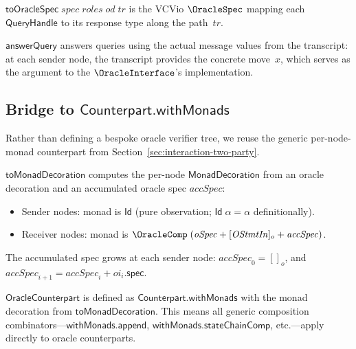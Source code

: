 \begin{definition}[toOracleSpec]
  \label{int:to-oracle-spec}
  $\mathsf{toOracleSpec}\;\mathit{spec}\;\mathit{roles}\;\mathit{od}\;
  \mathit{tr}$ is the VCVio $\OracleSpec$ mapping each $\mathsf{QueryHandle}$
  to its response type along the path~$\mathit{tr}$.
\end{definition}

$\mathsf{answerQuery}$ answers queries using the actual message values from the
transcript: at each sender node, the transcript provides the concrete move~$x$,
which serves as the argument to the $\OracleInterface$'s implementation.

\subsection{Bridge to \texorpdfstring{$\mathsf{Counterpart.withMonads}$}{Counterpart.withMonads}}

Rather than defining a bespoke oracle verifier tree, we reuse the generic
per-node-monad counterpart from Section~\ref{sec:interaction-two-party}.

\begin{definition}[toMonadDecoration]
  \label{int:to-monad-decoration}
  $\mathsf{toMonadDecoration}$ computes the per-node $\mathsf{MonadDecoration}$
  from an oracle decoration and an accumulated oracle spec $\mathit{accSpec}$:
  \begin{itemize}
    \item Sender nodes: monad is $\mathsf{Id}$ (pure observation; $\mathsf{Id}\;\alpha = \alpha$ definitionally).
    \item Receiver nodes: monad is $\OracleComp\;(\mathit{oSpec} + [\mathit{OStmtIn}]_o + \mathit{accSpec})$.
  \end{itemize}
  The accumulated spec grows at each sender node:
  $\mathit{accSpec}_0 = []_o$, and
  $\mathit{accSpec}_{i+1} = \mathit{accSpec}_i + \mathit{oi}_i.\mathsf{spec}$.
\end{definition}

\begin{definition}[OracleCounterpart]
  \label{int:oracle-counterpart}
  $\mathsf{OracleCounterpart}$ is defined as
  $\mathsf{Counterpart.withMonads}$ with the monad decoration from
  $\mathsf{toMonadDecoration}$.  This means all generic composition
  combinators---$\mathsf{withMonads.append}$,
  $\mathsf{withMonads.stateChainComp}$, etc.---apply directly to oracle
  counterparts.
\end{definition}

